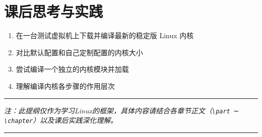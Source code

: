 \documentclass[12pt,UTF8]{ctexbook}
\begin{document}
\section{课后思考与实践}
\label{sec:kernel-practice}
\begin{enumerate}
    \item 在一台测试虚拟机上下载并编译最新的稳定版 Linux 内核
    \item 对比默认配置和自己定制配置的内核大小
    \item 尝试编译一个独立的内核模块并加载
    \item 理解编译内核各步骤的作用层次
\end{enumerate}

\vspace{1cm}
\hrule
\vspace{0.5cm}
\begin{center}
    \textit{注：此提纲仅作为学习Linux的框架，具体内容请结合各章节正文（\texttt{\textbackslash part} ∼ \texttt{\textbackslash chapter}）以及课后实践深化理解。}
\end{center}
\hrule
\vspace{1cm}
\end{document}
